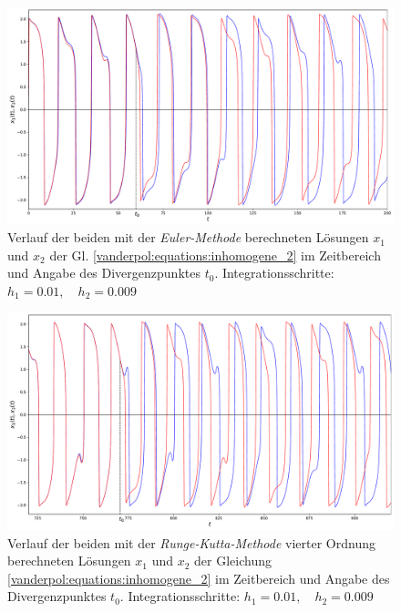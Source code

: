 \begin{figure}
\includegraphics[width=\textwidth]{papers/vanderpol/figures/EULER_schritt_delta_e-3.pdf}
\caption{Verlauf der beiden mit der {\em Euler-Methode} berechneten Lösungen $x_1$ und $x_2$ der Gl. \eqref{vanderpol:equations:inhomogene_2} im Zeitbereich und Angabe des Divergenzpunktes $t_0$. Integrationsschritte: $h_1 = 0.01, \quad h_2 = 0.009$\label{vanderpol:figures:EULER_schritt}}
\end{figure}

\begin{figure}
\includegraphics[width=\textwidth]{papers/vanderpol/figures/RK_schritt_delta_e-3.pdf}
\caption{Verlauf der beiden mit der {\em Runge-Kutta-Methode} vierter Ordnung berechneten Lösungen $x_1$ und $x_2$ der Gleichung \eqref{vanderpol:equations:inhomogene_2} im Zeitbereich und Angabe des Divergenzpunktes $t_0$. Integrationsschritte: $h_1 = 0.01, \quad h_2 = 0.009$\label{vanderpol:figures:RK_schritt_e-3}}
\end{figure}

